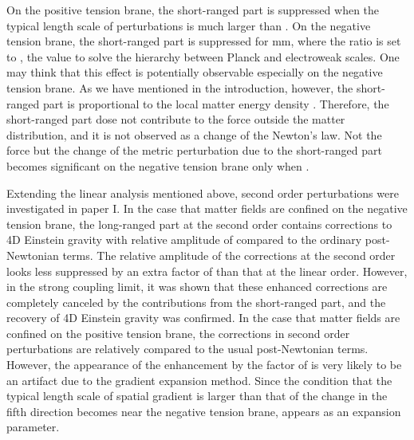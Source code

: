 \documentclass[a4paper,showpacs,preprintnumbers,amsmath,amssymb]{revtex4}
\begin{document}
On the positive tension brane, the short-ranged part is suppressed when the typical length scale \coordHE{} of perturbations is much larger than
\coordHE{}. 
On the negative tension brane, the short-ranged part is suppressed for \coordHE{} mm, where the ratio \coordHE{} is set to \coordHE{}, the value to solve the hierarchy between Planck and electroweak scales. 
One may think that this effect is potentially observable especially on the negative tension brane. 
As we have mentioned in the introduction, however, the short-ranged part is proportional to the local matter energy density \coordHE{}. Therefore, the short-ranged part dose not contribute to the force outside the matter distribution, and it is not observed as a change of the Newton's law. 
Not the force but the change of the metric perturbation due to the short-ranged part becomes significant on the negative tension brane only when \coordHE{}.


Extending the linear analysis mentioned above, second order perturbations were investigated in paper I.  In the case that matter fields are confined on the negative tension brane, the long-ranged part at the second order contains corrections to 4D Einstein gravity with relative amplitude of \coordHE{} compared to the ordinary post-Newtonian terms.
The relative amplitude of the corrections at the second order looks less suppressed by an extra factor of \coordHE{} than that at the linear order.
However, in the strong coupling limit, it was shown that these enhanced corrections are completely canceled by the contributions from the short-ranged part, and the recovery of 4D Einstein gravity was confirmed. 
In the case that matter fields are confined on the positive tension brane, the corrections in second order perturbations are relatively \coordHE{} compared to the usual post-Newtonian terms.  
However, the appearance of the enhancement by the factor of \coordHE{} is very likely to be an artifact due to the gradient expansion method. Since the condition that the typical length scale of spatial gradient is larger than that of the change in the fifth direction becomes \coordHE{} near the negative tension brane, \coordHE{} appears as an expansion parameter. 
 
\end{document}
